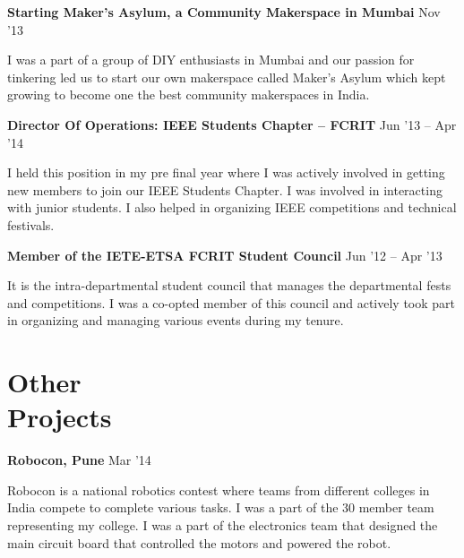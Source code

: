 \documentclass[margin,line]{res}
\newenvironment{list1}{
  \begin{list}{\ding{113}}{%
      \setlength{\itemsep}{0in}
      \setlength{\parsep}{0in} \setlength{\parskip}{0in}
      \setlength{\topsep}{0in} \setlength{\partopsep}{0in} 
      \setlength{\leftmargin}{0.17in}}}{\end{list}}
\begin{document}
\begin{resume}
{\bf Starting Maker's Asylum, a Community Makerspace in Mumbai} \hfill {Nov  '13} \\
\vspace*{-.13in}
\begin{list1}
\item[]
I was a part of a group of DIY enthusiasts in Mumbai and our passion for tinkering led us to start our own makerspace called Maker's Asylum which kept growing to become one the best community makerspaces in India.
\end{list1}

{\bf Director Of Operations: IEEE Students Chapter -- FCRIT} \hfill {Jun '13 -- Apr '14} \\
\vspace*{-.13in}
\begin{list1}
\item[]
I held this position in my pre final year where I was actively involved in getting new members to join our IEEE Students Chapter. I was involved in interacting with junior students. I also helped in organizing IEEE competitions and technical festivals.
\end{list1}

{\bf Member of the IETE-ETSA FCRIT Student Council} \hfill {Jun '12 -- Apr '13} \\
\vspace*{-.13in}
\begin{list1}
\item[]
It is the intra-departmental student council that manages the departmental fests and competitions. I was a co-opted member of this council and actively took part in organizing and managing various events during my tenure.
\end{list1}

\section{\sc Other \\Projects}
{\bf Robocon, Pune} \hfill {Mar '14} \\
\vspace*{-.15in}
\begin{list1}
\item[] 
Robocon is a national robotics contest where teams from different colleges in India compete to complete various tasks. I was a part of the 30 member team representing my college. I was a part of the electronics team that designed the main circuit board that controlled the motors and powered the robot.  
\end{list1}


\end{resume}
\end{document}
